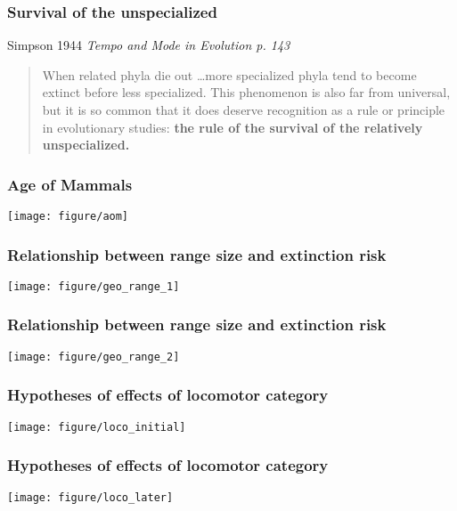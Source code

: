 \documentclass{beamer}
\begin{document}
\begin{frame}
  \frametitle{Survival of the unspecialized}
  \begin{block}{Simpson 1944 \em{Tempo and Mode in Evolution} p. 143}
    \begin{quote}
      When related phyla die out \dots more specialized phyla tend to become extinct before less specialized. This phenomenon is also far from universal, but it is so common that it does deserve recognition as a rule or principle in evolutionary studies: \textbf{the rule of the survival of the relatively unspecialized.}
    \end{quote}
  \end{block}
\end{frame}

\begin{frame}
  \frametitle{Age of Mammals}
  \begin{center}
    \texttt{[image: figure/aom]}
  \end{center}
\end{frame}

\begin{frame}
  \frametitle{Relationship between range size and extinction risk}
  \begin{center}
    \texttt{[image: figure/geo\_range\_1]}
  \end{center}
\end{frame}

\begin{frame}
  \frametitle{Relationship between range size and extinction risk}
  \begin{center}
    \texttt{[image: figure/geo\_range\_2]}
  \end{center}
\end{frame}

\begin{frame}
  \frametitle{Hypotheses of effects of locomotor category}
  \begin{center}
    \texttt{[image: figure/loco\_initial]}
  \end{center}
\end{frame}

\begin{frame}
  \frametitle{Hypotheses of effects of locomotor category}
  \begin{center}
    \texttt{[image: figure/loco\_later]}
  \end{center}
\end{frame}
\end{document}
